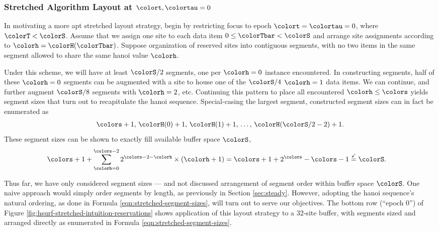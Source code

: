 \subsubsection{Stretched Algorithm Layout at $\colort,\colortau=0$}

In motivating a more apt stretched layout strategy, begin by restricting focus to epoch $\colort=\colortau=0$, where $\colorT < \colorS$.
Assume that we assign one site to each data item $0\leq \colorTbar < \colorS$ and arrange site assignments according to \hv{} $\colorh = \colorH(\colorTbar)$.
Suppose organization of reserved sites into contiguous segments, with no two items in the same segment allowed to share the same hanoi value $\colorh$.

Under this scheme, we will have at least $\colorS/2$ segments, one per \hv{} $\colorh=0$ instance encountered.
In constructing segments, half of these $\colorh=0$ segments can be augmented with a site to house one of the $\colorS/4$ \hv{} $\colorh=1$ data items.
We can continue, and further augment $\colorS/8$ segments with \hv{} $\colorh=2$, etc.
Continuing this pattern to place all encountered \hv{} $\colorh\leq\colors$ yields segment sizes that turn out to recapitulate the hanoi sequence.
Special-casing the largest segment, constructed segment sizes can in fact be enumerated as
\begin{align}
\colors + 1,\, \colorH(0) + 1,\, \colorH(1) + 1,\, \ldots,\, \colorH(\colorS/2 - 2) + 1.
\label{eqn:stretched-segment-sizes}
\end{align}
These segment sizes can be shown to exactly fill available buffer space $\colorS$,
\begin{align*}
\colors + 1
+  \sum_{\colorh = 0}^{\colors - 2}
2^{\colors - 2 - \colorh} \times (\colorh + 1)
&=
\colors + 1 +
2^{\colors} - \colors - 1
\stackrel{\checkmark}{=}
\colorS.
\end{align*}

Thus far, we have only considered segment sizes --- and not discussed arrangement of segment order within buffer space $\colorS$.
One naive approach would simply order segments by length, as previously in Section \ref{sec:steady}.
However, adopting the hanoi sequence's natural ordering, as done in Formula \ref{eqn:stretched-segment-sizes}, will turn out to serve our objectives.
The bottom row (``epoch 0'') of Figure \ref{fig:hsurf-stretched-intuition-reservations} shows application of this layout strategy to a 32-site buffer, with segments sized and arranged directly as enumerated in Formula \ref{eqn:stretched-segment-sizes}.

